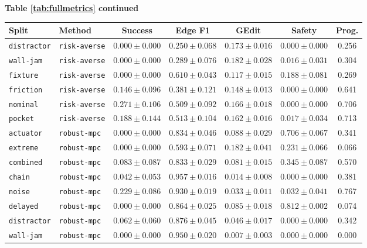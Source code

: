 \documentclass{article}
\begin{document}
\begin{center}
\textbf{Table \ref{tab:fullmetrics} continued}\\[0.4ex]
\begin{tabular}{llccccc}
\toprule
Split & Method & Success & Edge F1 & GEdit & Safety & Prog. \\
\midrule
\texttt{distractor} & \texttt{risk-averse} & $0.000 \pm 0.000$ & $0.250 \pm 0.068$ & $0.173 \pm 0.016$ & $0.000 \pm 0.000$ & 0.256 \\
\texttt{wall-jam} & \texttt{risk-averse} & $0.000 \pm 0.000$ & $0.289 \pm 0.076$ & $0.182 \pm 0.028$ & $0.016 \pm 0.031$ & 0.304 \\
\texttt{fixture} & \texttt{risk-averse} & $0.000 \pm 0.000$ & $0.610 \pm 0.043$ & $0.117 \pm 0.015$ & $0.188 \pm 0.081$ & 0.269 \\
\texttt{friction} & \texttt{risk-averse} & $0.146 \pm 0.096$ & $0.381 \pm 0.121$ & $0.148 \pm 0.013$ & $0.000 \pm 0.000$ & 0.641 \\
\texttt{nominal} & \texttt{risk-averse} & $0.271 \pm 0.106$ & $0.509 \pm 0.092$ & $0.166 \pm 0.018$ & $0.000 \pm 0.000$ & 0.706 \\
\texttt{pocket} & \texttt{risk-averse} & $0.188 \pm 0.144$ & $0.513 \pm 0.104$ & $0.162 \pm 0.016$ & $0.017 \pm 0.034$ & 0.713 \\
\texttt{actuator} & \texttt{robust-mpc} & $0.000 \pm 0.000$ & $0.834 \pm 0.046$ & $0.088 \pm 0.029$ & $0.706 \pm 0.067$ & 0.341 \\
\texttt{extreme} & \texttt{robust-mpc} & $0.000 \pm 0.000$ & $0.593 \pm 0.071$ & $0.182 \pm 0.041$ & $0.231 \pm 0.066$ & 0.066 \\
\texttt{combined} & \texttt{robust-mpc} & $0.083 \pm 0.087$ & $0.833 \pm 0.029$ & $0.081 \pm 0.015$ & $0.345 \pm 0.087$ & 0.570 \\
\texttt{chain} & \texttt{robust-mpc} & $0.042 \pm 0.053$ & $0.957 \pm 0.016$ & $0.014 \pm 0.008$ & $0.000 \pm 0.000$ & 0.381 \\
\texttt{noise} & \texttt{robust-mpc} & $0.229 \pm 0.086$ & $0.930 \pm 0.019$ & $0.033 \pm 0.011$ & $0.032 \pm 0.041$ & 0.767 \\
\texttt{delayed} & \texttt{robust-mpc} & $0.000 \pm 0.000$ & $0.864 \pm 0.025$ & $0.085 \pm 0.018$ & $0.812 \pm 0.002$ & 0.074 \\
\texttt{distractor} & \texttt{robust-mpc} & $0.062 \pm 0.060$ & $0.876 \pm 0.045$ & $0.046 \pm 0.017$ & $0.000 \pm 0.000$ & 0.342 \\
\texttt{wall-jam} & \texttt{robust-mpc} & $0.000 \pm 0.000$ & $0.950 \pm 0.020$ & $0.007 \pm 0.003$ & $0.000 \pm 0.000$ & 0.000 \\

\end{tabular}
\end{center}
\end{document}
